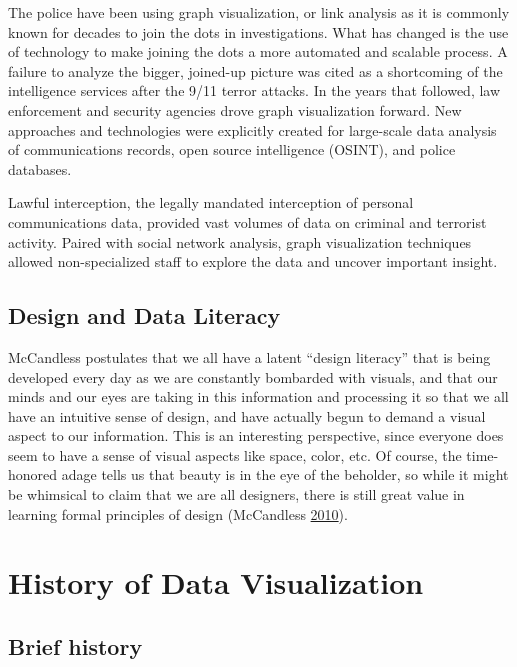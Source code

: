 \documentclass[]{book}
\begin{document}
The police have been using graph visualization, or link analysis as it is commonly known for decades to join the dots in investigations. What has changed is the use of technology to make joining the dots a more automated and scalable process. A failure to analyze the bigger, joined-up picture was cited as a shortcoming of the intelligence services after the 9/11 terror attacks. In the years that followed, law enforcement and security agencies drove graph visualization forward. New approaches and technologies were explicitly created for large-scale data analysis of communications records, open source intelligence (OSINT), and police databases.

Lawful interception, the legally mandated interception of personal communications data, provided vast volumes of data on criminal and terrorist activity. Paired with social network analysis, graph visualization techniques allowed non-specialized staff to explore the data and uncover important insight.

\hypertarget{design-and-data-literacy}{%
\subsection{Design and Data Literacy}\label{design-and-data-literacy}}

McCandless postulates that we all have a latent ``design literacy'' that is being developed every day as we are constantly bombarded with visuals, and that our minds and our eyes are taking in this information and processing it so that we all have an intuitive sense of design, and have actually begun to demand a visual aspect to our information. This is an interesting perspective, since everyone does seem to have a sense of visual aspects like space, color, etc. Of course, the time-honored adage tells us that beauty is in the eye of the beholder, so while it might be whimsical to claim that we are all designers, there is still great value in learning formal principles of design (McCandless \protect\hyperlink{ref-viz_ted}{2010}).

\hypertarget{history-of-data-visualization}{%
\section{History of Data Visualization}\label{history-of-data-visualization}}

\hypertarget{brief-history}{%
\subsection{Brief history}\label{brief-history}}
\end{document}
